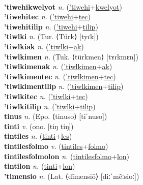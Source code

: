  \label{'tiwehiak} \\
\textbf{'tiwehikwelyot} \textit{n.} (\hyperref['tiwehi]{'tiwehi}+\hyperref[kwelyot]{kwelyot})
 \label{'tiwehikwelyot} \\
\textbf{'tiwehitec} \textit{n.} (\hyperref['tiwehi]{'tiwehi}+\hyperref[tec]{tec})
 \label{'tiwehitec} \\
\textbf{'tiwehitilip} \textit{n.} (\hyperref['tiwehi]{'tiwehi}+\hyperref[tilip]{tilip})
 \label{'tiwehitilip} \\
\textbf{'tiwlki} \textit{n.} (Tur. ⟨Türk⟩ [tyɾk])
 \label{'tiwlki} \\
\textbf{'tiwlkiak} \textit{n.} (\hyperref['tiwlki]{'tiwlki}+\hyperref[ak]{ak})
 \label{'tiwlkiak} \\
\textbf{'tiwlkimen} \textit{n.} (Tuk. ⟨türkmen⟩ [tʏɾkmɛn])
 \label{'tiwlkimen} \\
\textbf{'tiwlkimenak} \textit{n.} (\hyperref['tiwlkimen]{'tiwlkimen}+\hyperref[ak]{ak})
 \label{'tiwlkimenak} \\
\textbf{'tiwlkimentec} \textit{n.} (\hyperref['tiwlkimen]{'tiwlkimen}+\hyperref[tec]{tec})
 \label{'tiwlkimentec} \\
\textbf{'tiwlkimentilip} \textit{n.} (\hyperref['tiwlkimen]{'tiwlkimen}+\hyperref[tilip]{tilip})
 \label{'tiwlkimentilip} \\
\textbf{'tiwlkitec} \textit{n.} (\hyperref['tiwlki]{'tiwlki}+\hyperref[tec]{tec})
 \label{'tiwlkitec} \\
\textbf{'tiwlkitilip} \textit{n.} (\hyperref['tiwlki]{'tiwlki}+\hyperref[tilip]{tilip})
 \label{'tiwlkitilip} \\
\textbf{tinus} \textit{n.} (Epo. ⟨tinuso⟩ [tiˈnuso])
 \label{tinus} \\
\textbf{tinti} \textit{v.} (ono. [tiŋ tiŋ])
 \label{tinti} \\
\textbf{tintiles} \textit{n.} (\hyperref[tinti]{tinti}+\hyperref[les]{les})
 \label{tintiles} \\
\textbf{tintilesfolmo} \textit{v.} (\hyperref[tintiles]{tintiles}+\hyperref[folmo]{folmo})
 \label{tintilesfolmo} \\
\textbf{tintilesfolmolon} \textit{n.} (\hyperref[tintilesfolmo]{tintilesfolmo}+\hyperref[lon]{lon})
 \label{tintilesfolmolon} \\
\textbf{tintilon} \textit{n.} (\hyperref[tinti]{tinti}+\hyperref[lon]{lon})
 \label{tintilon} \\
\textbf{'timensio} \textit{n.} (Lat. ⟨dīmensiō⟩ [diːˈmẽːsioː])
 \label{'timensio} \\
